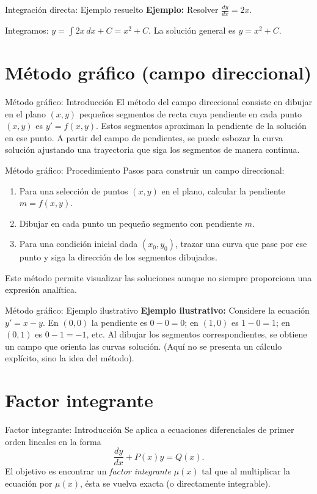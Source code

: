 \documentclass{beamer}
\begin{document}
\begin{frame}{Integración directa: Ejemplo resuelto}
\textbf{Ejemplo:} Resolver $\displaystyle\frac{dy}{dx} = 2x$.

Integramos: $y = \int 2x\,dx + C = x^2 + C$. La solución general es $y = x^2 + C$.
\end{frame}

\section*{Método gráfico (campo direccional)}
\begin{frame}{Método gráfico: Introducción}
El método del campo direccional consiste en dibujar en el plano $(x,y)$ pequeños segmentos de recta cuya pendiente en cada punto $(x,y)$ es $y'=f(x,y)$. Estos segmentos aproximan la pendiente de la solución en ese punto. A partir del campo de pendientes, se puede esbozar la curva solución ajustando una trayectoria que siga los segmentos de manera continua.
\end{frame}

\begin{frame}{Método gráfico: Procedimiento}
Pasos para construir un campo direccional:
\begin{enumerate}
  \item Para una selección de puntos $(x,y)$ en el plano, calcular la pendiente $m = f(x,y)$.
  \item Dibujar en cada punto un pequeño segmento con pendiente $m$.
  \item Para una condición inicial dada $(x_0,y_0)$, trazar una curva que pase por ese punto y siga la dirección de los segmentos dibujados.
\end{enumerate}
Este método permite visualizar las soluciones aunque no siempre proporciona una expresión analítica.
\end{frame}

\begin{frame}{Método gráfico: Ejemplo ilustrativo}
\textbf{Ejemplo ilustrativo:} Considere la ecuación $y' = x - y$. En $(0,0)$ la pendiente es $0-0=0$; en $(1,0)$ es $1-0=1$; en $(0,1)$ es $0-1=-1$, etc. Al dibujar los segmentos correspondientes, se obtiene un campo que orienta las curvas solución. (Aquí no se presenta un cálculo explícito, sino la idea del método).
\end{frame}

\section*{Factor integrante}
\begin{frame}{Factor integrante: Introducción}
Se aplica a ecuaciones diferenciales de primer orden lineales en la forma
\[
\frac{dy}{dx} + P(x)y = Q(x).
\]
El objetivo es encontrar un \emph{factor integrante} $\mu(x)$ tal que al multiplicar la ecuación por $\mu(x)$, ésta se vuelva exacta (o directamente integrable).
\end{frame}
\end{document}
